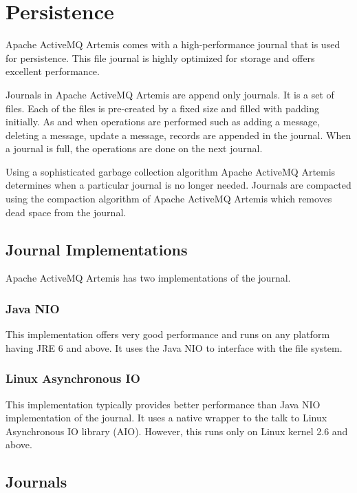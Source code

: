 \section{Persistence}

Apache ActiveMQ Artemis comes with a high-performance journal that is used for persistence. This file journal is highly optimized for storage and offers excellent performance.

Journals in Apache ActiveMQ Artemis are append only journals. It is a set of files. Each of the files is pre-created by a fixed size and filled with padding initially. As and when operations are performed such as adding a message, deleting a message, update a message, records are appended in the journal. When a journal is full, the operations are done on the next journal.

Using a sophisticated garbage collection algorithm Apache ActiveMQ Artemis determines when a particular journal is no longer needed. Journals are compacted using the compaction algorithm of Apache ActiveMQ Artemis which removes dead space from the journal.

\subsection{Journal Implementations}

Apache ActiveMQ Artemis has two implementations of the journal.

\subsubsection{Java NIO}

This implementation offers very good performance and runs on any platform having JRE 6 and above. It uses the Java NIO to interface with the file system.

\subsubsection{Linux Asynchronous IO}

This implementation typically provides better performance than Java NIO implementation of the journal. It uses a native wrapper to the talk to Linux Asynchronous IO library (AIO). However, this runs only on Linux kernel 2.6 and above. 

\subsection{Journals}

